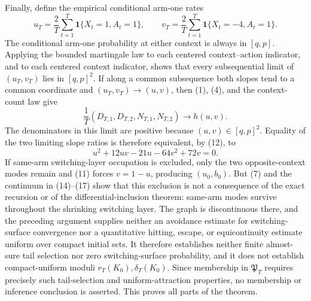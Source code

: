 Finally, define the empirical conditional arm-one rates
\[
 u_T=\frac2T\sum_{t=1}^T\mathbf1\{X_t=1,A_t=1\},\qquad
 v_T=\frac2T\sum_{t=1}^T\mathbf1\{X_t=-4,A_t=1\}.
\]
The conditional arm-one probability at either context is always in \([q,p]\).  Applying the bounded martingale law to each centered context--action indicator, and to each centered context indicator, shows that every subsequential limit of \((u_T,v_T)\) lies in \([q,p]^2\).  If along a common subsequence both slopes tend to a common coordinate and \((u_T,v_T)\to(u,v)\), then (1), (4), and the context-count law give
\[
 \frac1T(D_{T,1},D_{T,2},N_{T,1},N_{T,2})\longrightarrow h(u,v).
\]
The denominators in this limit are positive because \((u,v)\in[q,p]^2\).  Equality of the two limiting slope ratios is therefore equivalent, by (12), to
\[
 u^2+12uv-21u-64v^2+72v=0.
\]
If same-arm switching-layer occupation is excluded, only the two opposite-context modes remain and (11) forces \(v=1-u\), producing \((u_0,b_0)\).  But (7) and the continuum in (14)--(17) show that this exclusion is not a consequence of the exact recursion or of the differential-inclusion theorem: same-arm modes survive throughout the shrinking switching layer.  The graph is discontinuous there, and the preceding argument supplies neither an avoidance estimate for switching-surface convergence nor a quantitative hitting, escape, or equicontinuity estimate uniform over compact initial sets.  It therefore establishes neither finite almost-sure tail selection nor zero switching-surface probability, and it does not establish compact-uniform moduli \(r_T(K_0),\delta_T(K_0)\).  Since membership in \(\mathfrak P_T\) requires precisely such tail-selection and uniform-attraction properties, no membership or inference conclusion is asserted.  This proves all parts of the theorem.